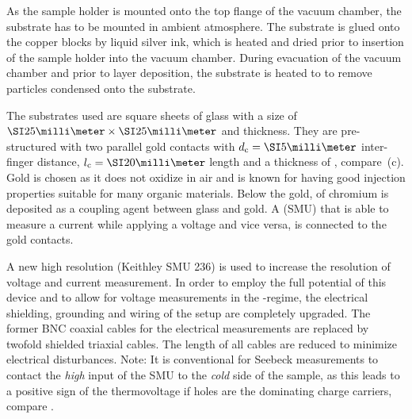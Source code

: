 As the sample holder is mounted onto the top flange of the vacuum chamber, the substrate has to be mounted in ambient atmosphere. The substrate is glued onto the copper blocks by liquid silver ink, which is heated and dried prior to insertion of the sample holder into the vacuum chamber. During evacuation of the vacuum chamber and prior to layer deposition, the substrate is heated to \Tsub[120] to remove particles condensed onto the substrate.

The substrates used are square sheets of glass with a size of \mbox{$\mm{25}\times\mm{25}$} and  thickness. They are pre-structured with two parallel gold contacts with \mbox{$\dc=\mm{5}$} inter-finger distance, \mbox{$\lc=\mm{20}$} length and a thickness of , compare \,(c). Gold is chosen as it does not oxidize in air and is known for having good injection properties suitable for many organic materials\cite{Kitamura2011}. Below the gold,  of chromium is deposited as a coupling agent between glass and gold.
A \SMU (SMU) that is able to measure a current while applying a voltage and vice versa, is connected to the gold contacts.

A new high resolution \SMU (Keithley SMU 236) is used to increase the resolution of voltage and current measurement. In order to employ the full potential of this device and to allow for voltage measurements in the \mV{}-regime, the electrical shielding, grounding and wiring of the setup are completely upgraded. The former BNC coaxial cables for the electrical measurements are replaced by twofold shielded triaxial cables. The length of all cables are reduced to minimize electrical disturbances. Note: It is conventional for Seebeck measurements to contact the \emph{high} input of the SMU to the \emph{cold} side of the sample, as this leads to a positive sign of the thermovoltage if holes are the dominating charge carriers, compare .

